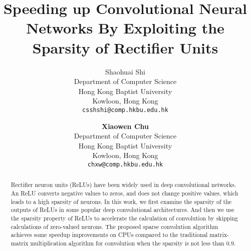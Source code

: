 \documentclass{article}
\begin{document}
\title{Speeding up Convolutional Neural Networks By Exploiting the Sparsity of Rectifier Units}

\author{
  Shaohuai Shi\\
  Department of Computer Science\\
  Hong Kong Baptist University\\
  Kowloon, Hong Kong\\
  \texttt{csshshi@comp.hkbu.edu.hk} \\
  \and
  \textbf{Xiaowen Chu}\\
  Department of Computer Science\\
  Hong Kong Baptist University\\
  Kowloon, Hong Kong\\
  \texttt{chxw@comp.hkbu.edu.hk} \\
  }


\maketitle

\begin{abstract}
Rectifier neuron units (ReLUs) have been widely used in deep convolutional networks. An ReLU converts negative values to zeros, and does not change positive values, which leads to a high sparsity of neurons. In this work, we first examine the sparsity of the outputs of ReLUs in some popular deep convolutional architectures. And then we use the sparsity property of ReLUs to accelerate the calculation of convolution by skipping calculations of zero-valued neurons. The proposed sparse convolution algorithm achieves some speedup improvements on CPUs compared to the traditional matrix-matrix multiplication algorithm for convolution when the sparsity is not less than 0.9.
\end{abstract}
\end{document}
